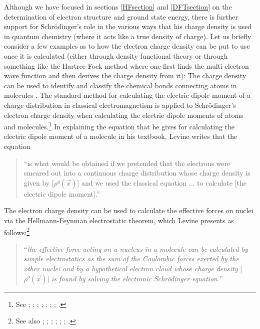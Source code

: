 \documentclass[onecolumn,secnumarabic,amsmath,amssymb,balancelastpage,nofootinbib]{article}
\begin{document}
Although we have focused in sections \ref{HFsection} and \ref{DFTsection} on the determination of electron structure and ground state energy, there is further support for Schr\"{o}dinger's role in the various ways that his charge density is used in quantum chemistry (where it acts like a true density of charge).  Let us briefly consider a few examples as to how the electron charge density can be put to use once it is calculated (either through density functional theory or through something like the Hartree-Fock method where one first finds the multi-electron wave function and then derives the charge density from it):  The charge density can be used to identify and classify the chemical bonds connecting atoms in molecules \cite{bader1990, shusterman1997, matta2002, bader2013}.  The standard method for calculating the electric dipole moment of a charge distribution in classical electromagnetism is applied to Schr\"{o}dinger's electron charge density when calculating the electric dipole moments of atoms and molecules.\footnote{See \cite[sec.\ 2]{schrodinger1926pt4}; \cite[pg.\ 1066--1068]{schrodinger1926rev}; \cite[sec.\ 3.1]{milonni1976}; \cite[sec.\ 3.4.7]{szaboQC}; \cite{bader1992}; \cite[pg.\ 2]{bader2010}; \cite[sec.\ 4.4]{bacciagaluppi2009}; \cite[sec.\ 14.2]{levineQC}.}  In explaining the equation that he gives for calculating the electric dipole moment of a molecule in his textbook, Levine \cite[pg.\ 407]{levineQC} writes that the equation
\begin{quote}
``is what would be obtained if we pretended that the electrons were smeared out into a continuous charge distribution whose charge density is given by [$\rho^q(\vec{x})$] and we used the classical equation ... to calculate [the electric dipole moment].'' 
\end{quote}
The electron charge density can be used to calculate the effective forces on nuclei via the Hellmann-Feynman electrostatic theorem, which Levine \cite[pg.\ 430]{levineQC} presents as follows:\footnote{See also \cite{feynman1939}; \cite{deb1973}; \cite[pg.\ 40]{milonni1976}; \cite[sec.\ 1.6]{parryang}; \cite[sec.\ 6.2]{gillespie2001}; \cite{bader2003}; \cite[sec.\ 4.1]{bader2010}.}
\begin{quote}
``\emph{the effective force acting on a nucleus in a molecule can be calculated by simple electrostatics as the sum of the Coulombic forces exerted by the other nuclei and by a hypothetical electron cloud whose charge density} [$\rho^q(\vec{x})$] \emph{is found by solving the electronic Schr\"{o}dinger equation.}''
\end{quote}
\end{document}
